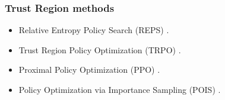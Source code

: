 \documentclass[english,aspectratio=1610]{beamer}
\theoremstyle{mystyle}
\theoremstyle{mystyle}
\theoremstyle{mystyle}
\begin{document}

\begin{frame}
\frametitle{Trust Region methods}
 	\begin{itemize}
 		\item Relative Entropy Policy Search (REPS) \citep{reps}. %
 		\item Trust Region Policy Optimization (TRPO) \citep{trpo}. %
 		\item Proximal Policy Optimization (PPO) \citep{ppo}. %
 		\item Policy Optimization via Importance Sampling (POIS) \citep{metellipolicy2018}. %
 	\end{itemize}
\end{frame} 
\end{document}

